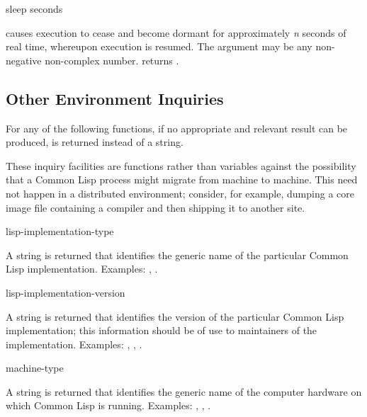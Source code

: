 \begin{defun}[Function]
sleep seconds

 causes execution to cease and become dormant for
approximately {\it n} seconds of real time, whereupon execution is resumed.
The argument may be any non-negative non-complex number.
 returns {\nil}.
\end{defun}

\subsection{Other Environment Inquiries}

For any of the following functions, if no appropriate
and relevant result can be produced, {\nil} is returned instead
of a string.

\beforenoterule
\begin{rationale}
These inquiry facilities are functions rather than variables
against the possibility that a Common Lisp process might migrate from
machine to machine.  This need not happen in a distributed
environment; consider, for example, dumping a core image file
containing a compiler and then shipping it to another site.
\end{rationale}
\afternoterule

\begin{defun}[Function]
lisp-implementation-type 

A string is returned that identifies the generic name of
the particular Common Lisp implementation.
Examples: , .
\end{defun}

\begin{defun}[Function]
lisp-implementation-version 

A string is returned that identifies the version of
the particular Common Lisp implementation; this information
should be of use to maintainers of the implementation.
Examples: , ,
.
\end{defun}

\begin{defun}[Function]
machine-type 

A string is returned that identifies the generic name of
the computer hardware on which Common Lisp is running.
Examples: , , .
\end{defun}

